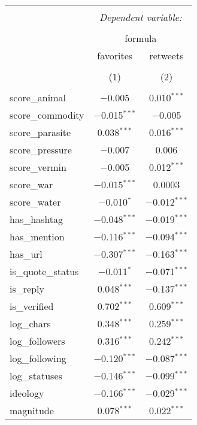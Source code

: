 
\begin{table}[!htbp] \centering 
  \caption{} 
  \label{} 
\begin{tabular}{@{\extracolsep{5pt}}lcc} 
\\[-1.8ex]\hline 
\hline \\[-1.8ex] 
 & \multicolumn{2}{c}{\textit{Dependent variable:}} \\ 
\cline{2-3} 
\\[-1.8ex] & \multicolumn{2}{c}{formula} \\ 
 & favorites & retweets \\ 
\\[-1.8ex] & (1) & (2)\\ 
\hline \\[-1.8ex] 
 score\_animal & $-$0.005 & 0.010$^{***}$ \\ 
  score\_commodity & $-$0.015$^{***}$ & $-$0.005 \\ 
  score\_parasite & 0.038$^{***}$ & 0.016$^{***}$ \\ 
  score\_pressure & $-$0.007 & 0.006 \\ 
  score\_vermin & $-$0.005 & 0.012$^{***}$ \\ 
  score\_war & $-$0.015$^{***}$ & 0.0003 \\ 
  score\_water & $-$0.010$^{*}$ & $-$0.012$^{***}$ \\ 
  has\_hashtag & $-$0.048$^{***}$ & $-$0.019$^{***}$ \\ 
  has\_mention & $-$0.116$^{***}$ & $-$0.094$^{***}$ \\ 
  has\_url & $-$0.307$^{***}$ & $-$0.163$^{***}$ \\ 
  is\_quote\_status & $-$0.011$^{*}$ & $-$0.071$^{***}$ \\ 
  is\_reply & 0.048$^{***}$ & $-$0.137$^{***}$ \\ 
  is\_verified & 0.702$^{***}$ & 0.609$^{***}$ \\ 
  log\_chars & 0.348$^{***}$ & 0.259$^{***}$ \\ 
  log\_followers & 0.316$^{***}$ & 0.242$^{***}$ \\ 
  log\_following & $-$0.120$^{***}$ & $-$0.087$^{***}$ \\ 
  log\_statuses & $-$0.146$^{***}$ & $-$0.099$^{***}$ \\ 
  ideology & $-$0.166$^{***}$ & $-$0.029$^{***}$ \\ 
  magnitude & 0.078$^{***}$ & 0.022$^{***}$ \\ 

\end{tabular}
\end{table}
